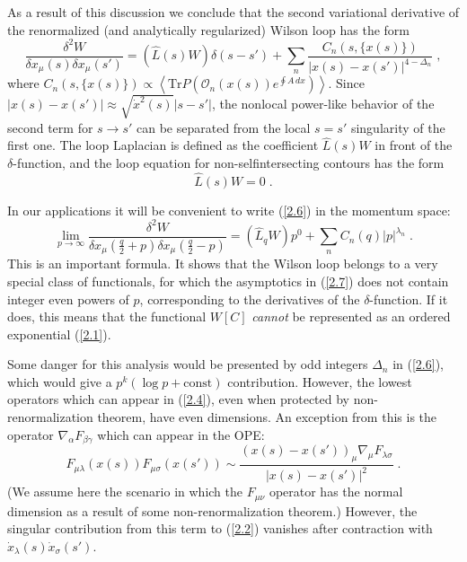 \documentclass[a4paper,12pt]{article}
\numberwithin{equation}{section}
\begin{document}
As a result of this discussion we conclude that the second variational derivative
of the renormalized (and analytically regularized) Wilson loop has the form
\begin{equation}
\label{2.6}
\frac{\delta ^{2}W}{\delta x_{\mu }(s)\delta x_{\mu }(s')}=(\widehat{{L}}(s)W)\delta (s-s')+\sum _{n}\frac{C_{n}(s,\{x(s)\})}{|x(s)-x(s')|^{4-\Delta _{n}}}\; ,
\end{equation}
 where \( C_{n}(s,\{x(s)\})\varpropto \left\langle \textrm{Tr}P\left( \mathcal{O}_{n}(x(s))e^{\oint A\, dx}\right) \right\rangle  \).
Since \( |x(s)-x(s')|\approx \sqrt{\dot{x}^{2}(s)}|s-s'| \), the nonlocal power-like
behavior of the second term for \( s\to s' \) can be separated from the local
\( s=s' \) singularity of the first one. The loop Laplacian is defined as the
coefficient \( \widehat{{L}}(s)W \) in front of the \( \delta  \)-function,
and the loop equation for non-selfintersecting contours has the form
\begin{equation}
\label{2.65}
\widehat{L}(s)W=0\; .
\end{equation}
 

In our applications it will be convenient to write (\ref{2.6}) in the momentum
space:
\begin{equation}
\label{2.7}
\lim _{p\to \infty }\frac{\delta ^{2}W}{\delta x_{\mu }\left( \frac{q}{2}+p\right) \delta x_{\mu }\left( \frac{q}{2}-p\right) }=(\widehat{{L}}_{q}W)p^{0}+\sum _{n}C_{n}(q)|p|^{\lambda _{n}}\; .
\end{equation}
 This is an important formula. It shows that the Wilson loop belongs to a very
special class of functionals, for which the asymptotics in (\ref{2.7}) does
not contain integer even powers of \( p \), corresponding to the derivatives
of the \( \delta  \)-function. If it does, this means that the functional \( W[C] \)
\emph{cannot} be represented as an ordered exponential (\ref{2.1}). 

Some danger for this analysis would be presented by odd integers \( \Delta _{n} \)
in (\ref{2.6}), which would give a \( p^{k}(\log p+\textrm{const}) \) contribution.
However, the lowest operators which can appear in (\ref{2.4}), even when protected
by non-renormalization theorem, have even dimensions. An exception from this
is the operator \( \nabla _{\alpha }F_{\beta \gamma } \) which can appear in
the OPE:
\[
F_{\mu \lambda }(x(s))F_{\mu \sigma }(x(s'))\sim \frac{(x(s)-x(s'))_{\mu }\nabla _{\mu }F_{\lambda \sigma }}{\left| x(s)-x(s')\right| ^{2}}\; .\]
 (We assume here the scenario in which the \( F_{\mu \nu } \) operator has
the normal dimension as a result of some non-renormalization theorem.) However,
the singular contribution from this term to (\ref{2.2}) vanishes after contraction
with \( \dot{x}_{\lambda }(s)\dot{x}_{\sigma }(s') \). 
\end{document}
